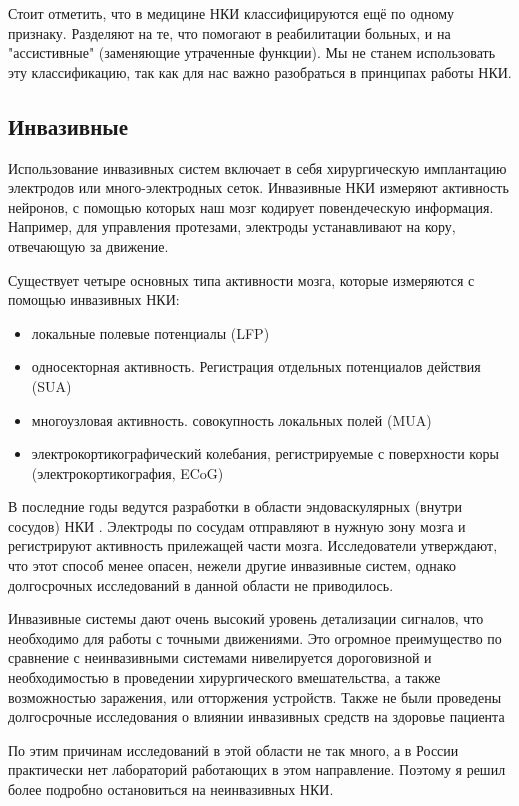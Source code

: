 Стоит отметить, что в медицине НКИ классифицируются ещё по одному признаку. Разделяют на те, что помогают в реабилитации больных, и на "ассистивные" (заменяющие утраченные функции). Мы не станем использовать эту классификацию, так как для нас важно разобраться в принципах работы НКИ.  
\subsection*{Инвазивные}
Использование инвазивных систем включает в себя хирургическую имплантацию электродов или много-электродных сеток. Инвазивные НКИ измеряют активность нейронов, с помощью которых наш мозг кодирует повендеческую информация. Например, для управления протезами, электроды устанавливают на кору, отвечающую за движение.

Существует четыре основных типа активности мозга, которые измеряются с помощью инвазивных НКИ: 
\begin{itemize}
	\item локальные полевые потенциалы (LFP)
	\item односекторная активность. Регистрация отдельных потенциалов действия (SUA)
	\item многоузловая активность. совокупность локальных полей (MUA)
	\item электрокортикографический колебания, регистрируемые с поверхности коры (электрокортикография, ECoG)
\end{itemize}
В последние годы ведутся разработки в области эндоваскулярных (внутри сосудов) НКИ \cite{litlink2}. Электроды по сосудам отправляют в нужную зону мозга и регистрируют активность прилежащей части мозга. Исследователи утверждают, что этот способ менее опасен, нежели другие инвазивные систем, однако долгосрочных исследований в данной области не приводилось. 

Инвазивные системы дают очень высокий уровень детализации сигналов, что необходимо для работы с точными движениями. Это огромное преимущество по сравнение с неинвазивными системами нивелируется дороговизной и необходимостью в проведении хирургического вмешательства, а также возможностью заражения, или отторжения устройств. Также не были проведены долгосрочные исследования о влиянии инвазивных средств на здоровье пациента

По этим причинам исследований в этой области не так много, а в России практически нет лабораторий работающих в этом направление. Поэтому я решил более подробно остановиться на неинвазивных НКИ.


